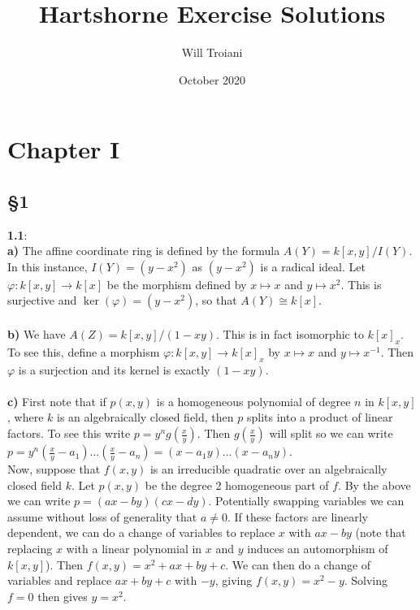 \documentclass[12pt]{article}
\title{Hartshorne Exercise Solutions}
\author{Will Troiani}
\date{October 2020}
\numberwithin{thm}{subsection}
\numberwithin{defn}{subsection}
\numberwithin{lemma}{subsection}
\numberwithin{example}{subsection}
\numberwithin{notation}{subsection}
\numberwithin{cor}{subsection}
\numberwithin{remark}{subsection}
\numberwithin{condition}{subsection}
\numberwithin{question}{subsection}
\numberwithin{construction}{subsection}
\numberwithin{construction}{subsection}
\numberwithin{construction}{subsection}
\begin{document}
\maketitle
\section{Chapter I}
\subsection{\S 1}
\textbf{1.1}:\\
%
\textbf{a)} The affine coordinate ring is defined by the formula $A(Y)=k[x,y]/I(Y)$. In this instance, $I(Y)=(y-x^2)$ as $(y-x^2)$ is a radical ideal. Let $\varphi:k[x,y]\to k[x]$ be the morphism defined by $x\mapsto x$ and $y\mapsto x^2$. This is surjective and $\ker(\varphi)=(y-x^2)$, so that $A(Y)\cong k[x]$.\\\\
%
\textbf{b)} We have $A(Z)=k[x,y]/(1-xy)$. This is in fact isomorphic to $k[x]_x$. To see this, define a morphism $\varphi:k[x,y]\to k[x]_x$ by $x\mapsto x$ and $y\mapsto x^{-1}$. Then $\varphi$ is a surjection and its kernel is exactly $(1-xy)$.\\\\
%
\textbf{c)} First note that if $p(x,y)$ is a homogeneous polynomial of degree $n$ in $k[x,y]$, where $k$ is an algebraically closed field, then $p$ splits into a product of linear factors. To see this write $p=y^ng(\frac{x}{y})$. Then $g(\frac{x}{y})$ will split so we can write $p=y^n(\frac{x}{y}-a_1)...(\frac{x}{y}-a_n)=(x-a_1y)...(x-a_ny)$.\\
        
        Now, suppose that $f(x,y)$ is an irreducible quadratic over an algebraically closed field $k$. Let $p(x,y)$ be the degree 2 homogeneous part of $f$. By the above we can write $p=(ax-by)(cx-dy)$. Potentially swapping variables we can assume without loss of generality that $a\neq 0$. If these factors are linearly dependent, we can do a change of variables to replace $x$ with $ax-by$ (note that replacing $x$ with a linear polynomial in $x$ and $y$ induces an automorphism of $k[x,y]$). Then $f(x,y)=x^2+ax+by+c$. We can then do a change of variables and replace $ax+by+c$ with $-y$, giving $f(x,y)=x^2-y$. Solving $f=0$ then gives $y=x^2$.\\
        
\end{document}
